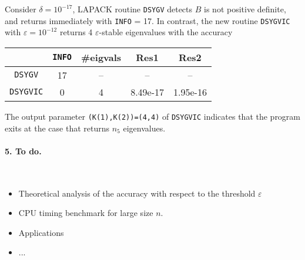 \documentclass[11pt]{article}
\begin{document}
\begin{description}
Consider $\delta=10^{-17}$, 
LAPACK routine {\tt DSYGV} detects $B$ is not positive definite, and 
returns immediately with {\tt INFO} = 17. 
In contrast, the new routine 
{\tt DSYGVIC} with $\varepsilon=10^{-12}$ returns 4
$\varepsilon$-stable eigenvalues with the accuracy 
\begin{center}
  \begin{tabular}{ c || c | c | c | c | } 
    		& {\tt INFO} & \#eigvals & Res1    & Res2     \\ \hline
  {\tt  DSYGV}   & 17   &   --      &  --      &  --      \\
  {\tt  DSYGVIC} &  0   &   4       & 8.49e-17 & 1.95e-16 \\ 
  \end{tabular}
\end{center} 
The output parameter {\tt (K(1),K(2))=(4,4)} of {\tt DSYGVIC} indicates that 
the program exits at the case that returns $n_5$ eigenvalues.


\end{description}

\paragraph{5. To do.} ~ 
\begin{itemize} 
\item Theoretical analysis of the accuracy with respect to the 
      threshold $\varepsilon$ 
\item CPU timing benchmark for large size $n$. 
\item Applications 
\item ...
\end{itemize} 




\end{document}
